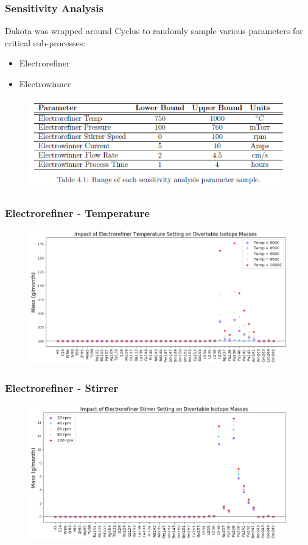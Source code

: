 \begin{frame}
\frametitle{Sensitivity Analysis}
Dakota was wrapped around Cyclus to randomly sample various parameters for critical sub-processes:
\begin{itemize}
	\item Electrorefiner
	\item Electrowinner
\end{itemize}

\begin{figure}
	\includegraphics[width=\linewidth]{sens-params}
\end{figure}
\end{frame}

\begin{frame}
\frametitle{Electrorefiner - Temperature}
\begin{figure}
	\includegraphics[width=\linewidth]{./images/temperature-sa-diff}
\end{figure}
\end{frame}

\begin{frame}
	\frametitle{Electrorefiner - Stirrer}
	\begin{figure}
		\includegraphics[width=\linewidth]{./images/rotation-sa-diff}
	\end{figure}
\end{frame}

